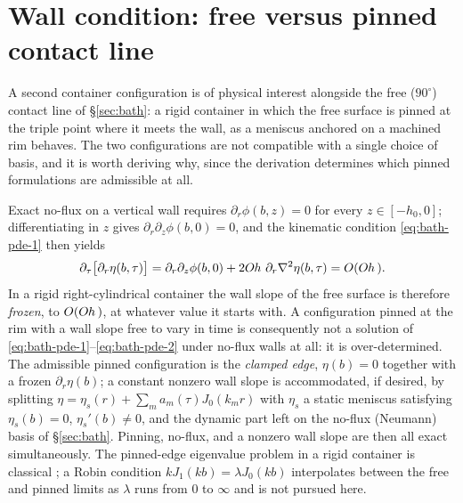 \section{Wall condition: free versus pinned contact line}
\label{sec:wall}

A second container configuration is of physical interest alongside the free ($90^\circ$) contact line of \S\ref{sec:bath}: a rigid container in which the free surface is pinned at the triple point where it meets the wall, as a meniscus anchored on a machined rim behaves. The two configurations are not compatible with a single choice of basis, and it is worth deriving why, since the derivation determines which pinned formulations are admissible at all.

Exact no-flux on a vertical wall requires $\partial_r\phi(b,z)=0$ for every $z\in[-h_0,0]$; differentiating in $z$ gives $\partial_r\partial_z\phi(b,0)=0$, and the kinematic condition \eqref{eq:bath-pde-1} then yields
\begin{equation}
    \partial_\tau\big[\partial_r\eta(b,\tau)\big] = \partial_r\partial_z\phi(b,0) + 2O\kern-0.04em h\,\,\partial_r\nabla^2\eta(b,\tau) = O(O\kern-0.04em h\,)\text{.}
    \label{eq:wall-slope-frozen}
\end{equation}
In a rigid right-cylindrical container the wall slope of the free surface is therefore \emph{frozen}, to $O(O\kern-0.04em h\,)$, at whatever value it starts with. A configuration pinned at the rim with a wall slope free to vary in time is consequently not a solution of \eqref{eq:bath-pde-1}--\eqref{eq:bath-pde-2} under no-flux walls at all: it is over-determined. The admissible pinned configuration is the \emph{clamped edge}, $\eta(b)=0$ together with a frozen $\partial_r\eta(b)$; a constant nonzero wall slope is accommodated, if desired, by splitting $\eta=\eta_s(r)+\sum_ma_m(\tau)J_0(k_mr)$ with $\eta_s$ a static meniscus satisfying $\eta_s(b)=0$, $\eta_s'(b)\ne0$, and the dynamic part left on the no-flux (Neumann) basis of \S\ref{sec:bath}. Pinning, no-flux, and a nonzero wall slope are then all exact simultaneously. The pinned-edge eigenvalue problem in a rigid container is classical \citep{Scott1979,GrahamEagle1983}; a Robin condition $kJ_1(kb)=\lambda J_0(kb)$ \citep{Hocking1987} interpolates between the free and pinned limits as $\lambda$ runs from $0$ to $\infty$ and is not pursued here.

